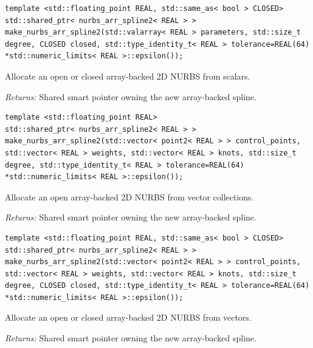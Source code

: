 \par\noindent\begin{minipage}{\linewidth}
\begin{lstlisting}[style=apireference]
template <std::floating_point REAL, std::same_as< bool > CLOSED>
std::shared_ptr< nurbs_arr_spline2< REAL > > make_nurbs_arr_spline2(std::valarray< REAL > parameters, std::size_t degree, CLOSED closed, std::type_identity_t< REAL > tolerance=REAL(64) *std::numeric_limits< REAL >::epsilon());
\end{lstlisting}
{\footnotesize Allocate an open or closed array-backed 2D NURBS from scalars.\par}
{\footnotesize\textit{Returns:} Shared smart pointer owning the new array-backed spline.\par}
\end{minipage}\par\vspace{1pt}
\par\noindent\begin{minipage}{\linewidth}
\begin{lstlisting}[style=apireference]
template <std::floating_point REAL>
std::shared_ptr< nurbs_arr_spline2< REAL > > make_nurbs_arr_spline2(std::vector< point2< REAL > > control_points, std::vector< REAL > weights, std::vector< REAL > knots, std::size_t degree, std::type_identity_t< REAL > tolerance=REAL(64) *std::numeric_limits< REAL >::epsilon());
\end{lstlisting}
{\footnotesize Allocate an open array-backed 2D NURBS from vector collections.\par}
{\footnotesize\textit{Returns:} Shared smart pointer owning the new array-backed spline.\par}
\end{minipage}\par\vspace{1pt}
\par\noindent\begin{minipage}{\linewidth}
\begin{lstlisting}[style=apireference]
template <std::floating_point REAL, std::same_as< bool > CLOSED>
std::shared_ptr< nurbs_arr_spline2< REAL > > make_nurbs_arr_spline2(std::vector< point2< REAL > > control_points, std::vector< REAL > weights, std::vector< REAL > knots, std::size_t degree, CLOSED closed, std::type_identity_t< REAL > tolerance=REAL(64) *std::numeric_limits< REAL >::epsilon());
\end{lstlisting}
{\footnotesize Allocate an open or closed array-backed 2D NURBS from vectors.\par}
{\footnotesize\textit{Returns:} Shared smart pointer owning the new array-backed spline.\par}
\end{minipage}\par\vspace{1pt}
